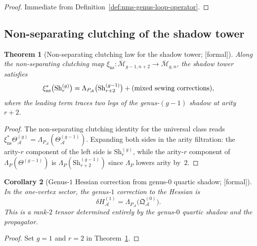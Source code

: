 \documentclass[11pt,oneside]{memoir}
\numberwithin{equation}{chapter}
\newtheorem{theorem}{Theorem}[chapter]
\newtheorem{corollary}[theorem]{Corollary}
\theoremstyle{definition}
\newcommand{\ClaimStatusProvedHere}{\textnormal{[formal]}}
\newcommand{\cA}{\mathcal A}
\begin{document}
\begin{proof}
Immediate from Definition~\ref{def:nms-genus-loop-operator}.\qedhere
\end{proof}

\subsection{Non-separating clutching of the shadow tower}
\label{subsec:nms-nonseparating-clutching}

\begin{theorem}[Non-separating clutching law for the shadow tower; \ClaimStatusProvedHere]
\label{thm:nms-nonseparating-clutching-law}
Along the non-separating clutching map
$\xi_{\mathrm{ns}}\colon \overline{\mathcal M}_{g-1,n+2}\to \overline{\mathcal M}_{g,n}$,
the shadow tower satisfies
\begin{equation}
\label{eq:nms-nonseparating-recursion}
\xi_{\mathrm{ns}}^*\bigl(\mathrm{Sh}_r^{(g)}\bigr)
=
\Lambda_{P_{\cA}}\bigl(\mathrm{Sh}_{r+2}^{(g-1)}\bigr)
+
\textup{(mixed sewing corrections)},
\end{equation}
where the leading term traces two legs of the genus-$(g-1)$ shadow at arity $r+2$.
\end{theorem}

\begin{proof}
The non-separating clutching identity for the universal class reads
$\xi_{\mathrm{ns}}^*\Theta_{\cA}^{(g)}
=
\Lambda_{P_{\cA}}(\Theta_{\cA}^{(g-1)})$.
Expanding both sides in the arity filtration: the arity-$r$ component of the left side is $\mathrm{Sh}_r^{(g)}$, while the arity-$r$ component of $\Lambda_P(\Theta^{(g-1)})$ is $\Lambda_P(\mathrm{Sh}_{r+2}^{(g-1)})$ since $\Lambda_P$ lowers arity by~$2$.\qedhere
\end{proof}

\begin{corollary}[Genus-$1$ Hessian correction from genus-$0$ quartic shadow; \ClaimStatusProvedHere]
\label{cor:nms-genus-one-hessian-correction}
In the one-vertex sector, the genus-$1$ correction to the Hessian is
\begin{equation}
\label{eq:nms-genus-one-hessian-correction}
\delta H_{\cA}^{(1)}
=
\Lambda_{P_{\cA}}\bigl(\mathfrak Q_{\cA}^{(0)}\bigr).
\end{equation}
This is a rank-$2$ tensor determined entirely by the genus-$0$ quartic shadow and the propagator.
\end{corollary}

\begin{proof}
Set $g=1$ and $r=2$ in Theorem~\ref{thm:nms-nonseparating-clutching-law}.\qedhere
\end{proof}
\end{document}
